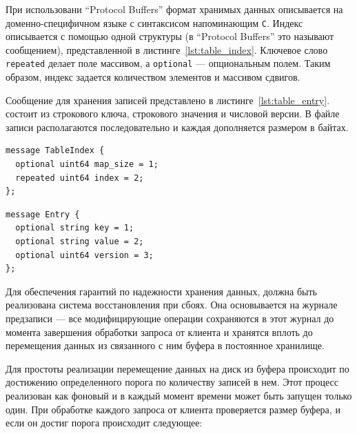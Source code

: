 \documentclass[14pt, russian]{scrartcl}
\begin{document}
При использовани ``Protocol Buffers'' формат хранимых данных описывается на
доменно-специфичном языке с синтаксисом напоминающим \verb|C|. Индекс
описывается с помощью одной структуры (в ``Protocol Buffers'' это называют
сообщением), представленной в листинге~\ref{lst:table_index}. Ключевое слово
\verb|repeated| делает поле массивом, а \verb|optional| --- опциональным полем.
Таким образом, индекс задается количеством элементов и массивом сдвигов.

Сообщение для хранения записей представлено в листинге~\ref{lst:table_entry}.
состоит из строкового ключа, строкового значения и числовой версии. В файле
записи располагаются последовательно и каждая дополняется размером в байтах.

\begin{listing}
  \caption{Объявление структуры индекса для постоянного хранилища.}
  \label{lst:table_index}
  \begin{verbatim}
message TableIndex {
  optional uint64 map_size = 1;
  repeated uint64 index = 2;
};
  \end{verbatim}
\end{listing}

\begin{listing}
  \caption{Объявление структуры записи для постоянного хранилища.}
  \label{lst:table_entry}
  \begin{verbatim}
message Entry {
  optional string key = 1;
  optional string value = 2;
  optional uint64 version = 3;
};
  \end{verbatim}
\end{listing}

Для обеспечения гарантий по надежности хранения данных, должна быть реализована
система восстановления при сбоях. Она основывается на журнале предзаписи --- все
модифицирующие операции сохраняются в этот журнал до момента завершения
обработки запроса от клиента и хранятся вплоть до перемещения данных из
связанного с ним буфера в постоянное хранилище.

Для простоты реализации перемещение данных на диск из буфера происходит по
достижению определенного порога по количеству записей в нем. Этот процесс
реализован как фоновый и в каждый момент времени может быть запущен только один.
При обработке каждого запроса от клиента проверяется размер буфера, и если он
достиг порога происходит следующее:
\end{document}
